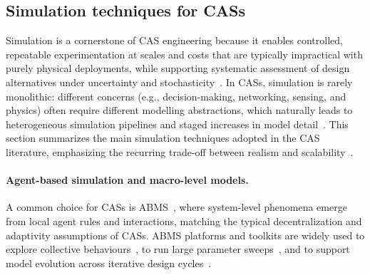 \subsection{Simulation techniques for \acp{CAS}}\label{sec:simulation-techniques}

Simulation is a cornerstone of \ac{CAS} engineering because it enables controlled,
repeatable experimentation at scales and costs that are typically impractical with purely physical deployments,
while supporting systematic assessment of design alternatives under uncertainty and stochasticity~\cite{MittalRiscoMartin2017SimBasedCAS,DBLP:journals/jos/Sargent13}.
%
In \acp{CAS}, simulation is rarely monolithic:
different concerns (e.g., decision-making, networking, sensing, and physics)
often require different modelling abstractions,
which naturally leads to heterogeneous simulation pipelines and staged increases in model detail~\cite{DBLP:journals/csur/GomesTBLV18}.
%
This section summarizes the main simulation techniques adopted in the \ac{CAS} literature,
emphasizing the recurring trade-off between realism and scalability~\cite{DBLP:journals/isci/Schut10}.

\paragraph{Agent-based simulation and macro-level models.}
A common choice for \acp{CAS} is \ac{ABMS}~\cite{DBLP:journals/csr/AbarTLO17},
where system-level phenomena emerge from local agent rules and interactions,
matching the typical decentralization and adaptivity assumptions of \acp{CAS}.
%
\ac{ABMS} platforms and toolkits are widely used to explore collective behaviours~\cite{DBLP:journals/simulation/LukeCPSB05,North2013RepastSimphony},
to run large parameter sweeps~\cite{DBLP:conf/hpcs/PianiniSV14},
and to support model evolution across iterative design cycles~\cite{DBLP:journals/jos/PianiniMV13}.
%

